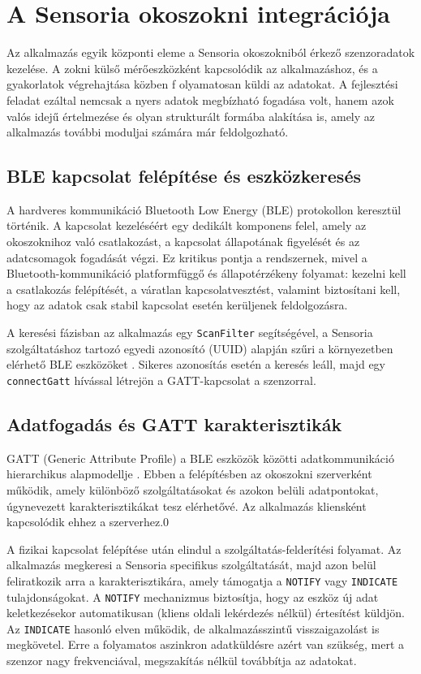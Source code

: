 \section{A Sensoria okoszokni integrációja}

Az alkalmazás egyik központi eleme a Sensoria okoszokniból érkező szenzoradatok kezelése.
A zokni külső mérőeszközként kapcsolódik az alkalmazáshoz, és a gyakorlatok végrehajtása közben f
olyamatosan küldi az adatokat. A fejlesztési feladat ezáltal nemcsak a nyers adatok megbízható
fogadása volt, hanem azok valós idejű értelmezése és olyan strukturált formába alakítása is, amely
az alkalmazás további moduljai számára már feldolgozható.

\subsection{BLE kapcsolat felépítése és eszközkeresés}

A hardveres kommunikáció Bluetooth Low Energy (BLE) protokollon keresztül történik.
A kapcsolat kezeléséért egy dedikált komponens felel, amely az okoszoknihoz való csatlakozást,
a kapcsolat állapotának figyelését és az adatcsomagok fogadását végzi. Ez kritikus pontja a rendszernek,
mivel a Bluetooth-kommunikáció platformfüggő és állapotérzékeny folyamat: kezelni kell
a csatlakozás felépítését, a váratlan kapcsolatvesztést, valamint biztosítani kell, hogy az adatok
csak stabil kapcsolat esetén kerüljenek feldolgozásra.

A keresési fázisban az alkalmazás egy \texttt{ScanFilter} segítségével, a Sensoria szolgáltatáshoz
tartozó egyedi azonosító (UUID) alapján szűri a környezetben elérhető BLE eszközöket \cite{androidble}.
Sikeres azonosítás
esetén a keresés leáll, majd egy \texttt{connectGatt} hívással létrejön a GATT-kapcsolat a szenzorral.
\cite{connectGatt}

\subsection{Adatfogadás és GATT karakterisztikák}

GATT (Generic Attribute Profile) a BLE eszközök közötti adatkommunikáció hierarchikus alapmodellje \cite{androidble}.
Ebben a felépítésben az okoszokni szerverként működik, amely különböző szolgáltatásokat és azokon
belüli adatpontokat, úgynevezett karakterisztikákat tesz elérhetővé. Az alkalmazás kliensként
kapcsolódik ehhez a szerverhez.0

A fizikai kapcsolat felépítése után elindul a szolgáltatás-felderítési folyamat. Az alkalmazás megkeresi
a Sensoria specifikus szolgáltatását, majd azon belül feliratkozik arra a karakterisztikára, amely
támogatja a \texttt{NOTIFY} vagy \texttt{INDICATE} tulajdonságokat. A \texttt{NOTIFY} mechanizmus
biztosítja, hogy az eszköz új adat keletkezésekor automatikusan (kliens oldali lekérdezés nélkül)
értesítést küldjön. Az \texttt{INDICATE} hasonló elven működik, de alkalmazásszintű visszaigazolást is
megkövetel. Erre a folyamatos aszinkron adatküldésre azért van szükség, mert a szenzor nagy frekvenciával,
megszakítás nélkül továbbítja az adatokat.

